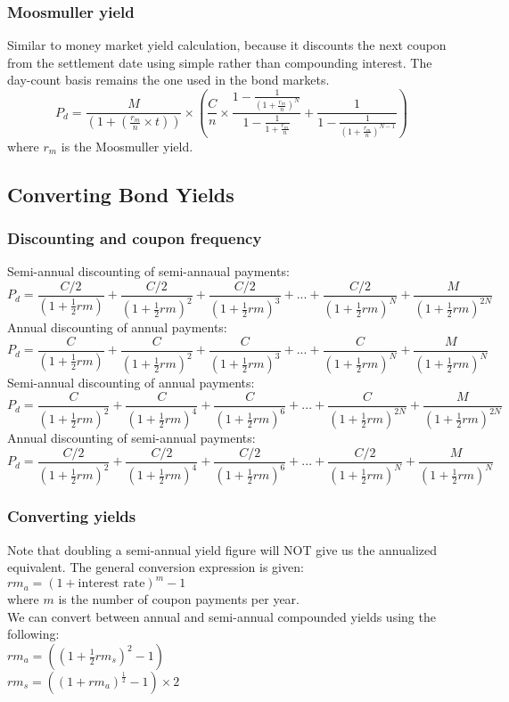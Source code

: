 \documentclass[8pt,a4paper]{article}
\begin{document}
\subsubsection{Moosmuller yield}
Similar to money market yield calculation, because it discounts the next coupon from the settlement date using simple rather than compounding interest. The day-count basis remains the one used in the bond markets.
\[
P_d=\frac{M}{(1+(\frac{r_m}{n}\times t))}\times (\frac{C}{n}\times \frac{1-\frac{1}{(1+\frac{r_m}{n})^N}}{1-\frac{1}{{1+\frac{r_m}{n}}}} + \frac{1}{1-\frac{1}{(1+\frac{r_m}{n})^{N-1}}})
\]
where $r_m$ is the Moosmuller yield.

\subsection{Converting Bond Yields}
\subsubsection{Discounting and coupon frequency}
Semi-annual discounting of semi-annaual payments:
\[
P_d=\frac{C/2}{(1+\frac{1}{2}rm)} +
		\frac{C/2}{(1+\frac{1}{2}rm)^2} +
		\frac{C/2}{(1+\frac{1}{2}rm)^3} +...+
		\frac{C/2}{(1+\frac{1}{2}rm)^N} +
		\frac{M}{(1+\frac{1}{2}rm)^{2N}}
\]
Annual discounting of annual payments:
\[
P_d=\frac{C}{(1+\frac{1}{2}rm)} +
		\frac{C}{(1+\frac{1}{2}rm)^2} +
		\frac{C}{(1+\frac{1}{2}rm)^3} +...+
		\frac{C}{(1+\frac{1}{2}rm)^N} +
		\frac{M}{(1+\frac{1}{2}rm)^N}
\]
Semi-annual discounting of annual payments:
\[
P_d=\frac{C}{(1+\frac{1}{2}rm)^2} +
		\frac{C}{(1+\frac{1}{2}rm)^4} +
		\frac{C}{(1+\frac{1}{2}rm)^6} +...+
		\frac{C}{(1+\frac{1}{2}rm)^{2N}} +
		\frac{M}{(1+\frac{1}{2}rm)^{2N}}
\]
Annual discounting of semi-annual payments:
\[
P_d=\frac{C/2}{(1+\frac{1}{2}rm)^2} +
		\frac{C/2}{(1+\frac{1}{2}rm)^4} +
		\frac{C/2}{(1+\frac{1}{2}rm)^6} +...+
		\frac{C/2}{(1+\frac{1}{2}rm)^N} +
		\frac{M}{(1+\frac{1}{2}rm)^N}
\]

\subsubsection{Converting yields}
Note that doubling a semi-annual yield figure will NOT give us the annualized equivalent.
The general conversion expression is given:\\
$rm_a=(1+\mbox{interest rate})^m - 1$\\
where $m$ is the number of coupon payments per year.\\
We can convert between annual and semi-annual compounded yields using the following:\\
$rm_a=((1+\frac{1}{2}rm_s)^2 - 1)$\\
$rm_s=((1+rm_a)^{\frac{1}{2}} - 1)\times 2$
\end{document}
